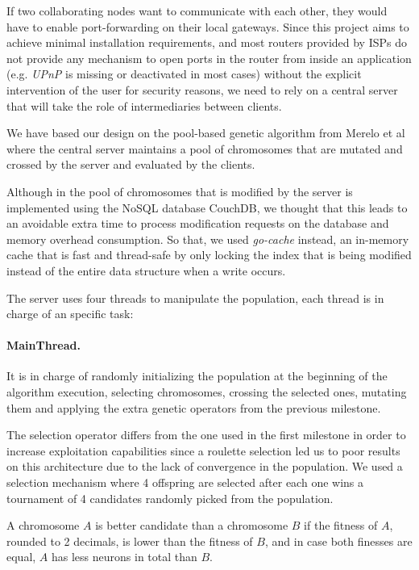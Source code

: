 If two collaborating nodes want to communicate with each other, they would have to enable port-forwarding on their local gateways. Since this project aims to achieve minimal installation requirements, and most routers provided by ISPs do not provide any mechanism to open ports in the router from inside an application (e.g. \textit{UPnP} \cite{wiki-upnp} is missing or deactivated in most cases) without the explicit intervention of the user for security reasons, we need to rely on a central server that will take the role of intermediaries between clients.

We have based our design on the pool-based genetic algorithm from Merelo et al \cite{paper-pool-jj} where the central server maintains a pool of chromosomes that are mutated and crossed by the server and evaluated by the clients.

Although in \cite{paper-pool-jj} the pool of chromosomes that is modified by the server is implemented using the NoSQL database CouchDB, we thought that this leads to an avoidable extra time to process modification requests on the database and memory overhead consumption. So that, we used \textit{go-cache} \cite{go-cache} instead, an in-memory cache that is fast and thread-safe by only locking the index that is being modified instead of the entire data structure when a write occurs.

The server uses four threads to manipulate the population, each thread is in charge of an specific task:

\paragraph*{MainThread.} It is in charge of randomly initializing the population at the beginning of the algorithm execution, selecting chromosomes, crossing the selected ones, mutating them and applying the extra genetic operators from the previous milestone.

The selection operator differs from the one used in the first milestone in order to increase exploitation capabilities since a roulette selection led us to poor results on this architecture due to the lack of convergence in the population. We used a selection mechanism where 4 offspring are selected after each one wins a tournament of 4 candidates randomly picked from the population.

A chromosome $A$ is better candidate than a chromosome $B$ if the fitness of $A$, rounded to 2 decimals, is lower than the fitness of $B$, and in case both finesses are equal, $A$ has less neurons in total than $B$.

